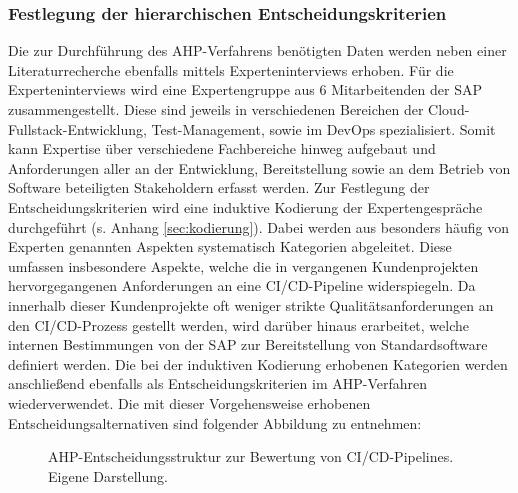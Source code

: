 \subsubsection{Festlegung der hierarchischen Entscheidungskriterien}
 Die zur Durchführung des AHP-Verfahrens benötigten Daten werden neben einer Literaturrecherche ebenfalls mittels Experteninterviews erhoben. Für die Experteninterviews wird eine Expertengruppe aus 6 Mitarbeitenden der SAP zusammengestellt. Diese sind jeweils in verschiedenen Bereichen der Cloud-Fullstack-Entwicklung, Test-Management, sowie im DevOps spezialisiert. Somit kann Expertise über verschiedene Fachbereiche hinweg aufgebaut und Anforderungen aller an der Entwicklung, Bereitstellung sowie an dem Betrieb von Software beteiligten Stakeholdern erfasst werden. Zur Festlegung der Entscheidungskriterien wird eine induktive Kodierung der Expertengespräche durchgeführt (s. Anhang \ref{sec:kodierung}). Dabei werden aus besonders häufig von Experten genannten Aspekten systematisch Kategorien abgeleitet. Diese umfassen insbesondere Aspekte, welche die in vergangenen Kundenprojekten hervorgegangenen Anforderungen an eine CI/CD-Pipeline widerspiegeln. Da innerhalb dieser Kundenprojekte oft weniger strikte Qualitätsanforderungen an den CI/CD-Prozess gestellt werden, wird darüber hinaus erarbeitet, welche internen Bestimmungen von der SAP zur Bereitstellung von Standardsoftware definiert werden. Die bei der induktiven Kodierung erhobenen Kategorien werden anschließend ebenfalls als Entscheidungskriterien im AHP-Verfahren wiederverwendet. Die mit dieser Vorgehensweise erhobenen Entscheidungsalternativen sind folgender Abbildung zu entnehmen:
 \begin{center}
	\begin{figure}[H]
		\centering
		\caption[AHP-Entscheidungsstruktur zur Bewertung von CI/CD-Pipelines]{AHP-Entscheidungsstruktur zur Bewertung von CI/CD-Pipelines. Eigene Darstellung.}
		\label{fig:AHP_E}
	\end{figure}
\end{center}
\vspace*{-15mm}
